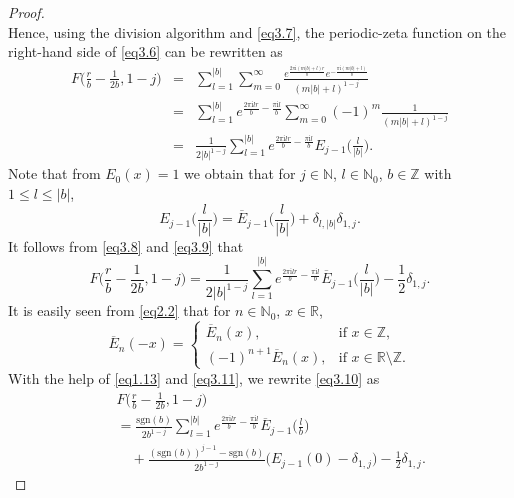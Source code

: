 \documentclass[reqno]{amsart}
\numberwithin{equation}{section}
\begin{document}
\begin{proof}
\begin{equation*}
\end{equation*}
Hence, using the division algorithm and \eqref{eq3.7}, the periodic-zeta function on the right-hand side of \eqref{eq3.6} can be rewritten as
\begin{eqnarray}\label{eq3.8}
F\biggl(\frac{r}{b}-\frac{1}{2b},1-j\biggl)&=&\sum_{l=1}^{|b|}\sum_{m=0}^{\infty}\frac{e^{\frac{2\pi \mathrm{i}(m|b|+l)r}{b}}e^{-\frac{\pi \mathrm{i}(m|b|+l)}{b}}}{(m|b|+l)^{1-j}}\nonumber\\
&=&\sum_{l=1}^{|b|}e^{\frac{2\pi \mathrm{i}lr}{b}-\frac{\pi\mathrm{i}l}{b}}\sum_{m=0}^{\infty}(-1)^{m}\frac{1}{(m|b|+l)^{1-j}}\nonumber\\
&=&\frac{1}{2|b|^{1-j}}\sum_{l=1}^{|b|}e^{\frac{2\pi \mathrm{i}lr}{b}-\frac{\pi\mathrm{i}l}{b}}E_{j-1}\biggl(\frac{l}{|b|}\biggl).
\end{eqnarray}
Note that from $E_{0}(x)=1$ we obtain that for $j\in\mathbb{N}$, $l\in\mathbb{N}_{0}$, $b\in\mathbb{Z}$ with $1\leq l\leq |b|$,
\begin{equation}\label{eq3.9}
E_{j-1}\biggl(\frac{l}{|b|}\biggl)=\overline{E}_{j-1}\biggl(\frac{l}{|b|}\biggl)+\delta_{l,|b|}\delta_{1,j}.
\end{equation}
It follows from \eqref{eq3.8} and \eqref{eq3.9} that
\begin{equation}\label{eq3.10}
F\biggl(\frac{r}{b}-\frac{1}{2b},1-j\biggl)=\frac{1}{2|b|^{1-j}}\sum_{l=1}^{|b|}e^{\frac{2\pi \mathrm{i}lr}{b}-\frac{\pi\mathrm{i}l}{b}}\overline{E}_{j-1}\biggl(\frac{l}{|b|}\biggl)-\frac{1}{2}\delta_{1,j}.
\end{equation}
It is easily seen from \eqref{eq2.2} that for $n\in\mathbb{N}_{0}$, $x\in\mathbb{R}$,
\begin{equation}\label{eq3.11}
\overline{E}_{n}(-x)=\begin{cases}
\overline{E}_{n}(x),  &\text{if $x\in\mathbb{Z}$},\\
(-1)^{n+1}\overline{E}_{n}(x),  &\text{if $x\in\mathbb{R}\setminus\mathbb{Z}$}.
\end{cases}
\end{equation}
With the help of \eqref{eq1.13} and \eqref{eq3.11}, we rewrite \eqref{eq3.10} as
\begin{eqnarray}\label{eq3.12}
&&F\biggl(\frac{r}{b}-\frac{1}{2b},1-j\biggl)\nonumber\\
&&=\frac{\mathrm{sgn}(b)}{2b^{1-j}}\sum_{l=1}^{|b|}e^{\frac{2\pi \mathrm{i}lr}{b}-\frac{\pi\mathrm{i}l}{b}}\overline{E}_{j-1}\biggl(\frac{l}{b}\biggl)\nonumber\\
&&\quad+\frac{(\mathrm{sgn}(b))^{j-1}-\mathrm{sgn}(b)}{2b^{1-j}}\bigl(E_{j-1}(0)-\delta_{1,j}\bigl)-\frac{1}{2}\delta_{1,j}.

\end{eqnarray}
\end{proof}
\end{document}
